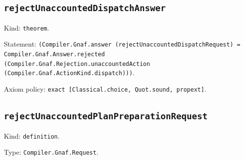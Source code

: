 \documentclass[11pt]{article}
\begin{document}
\subsection*{\texttt{rejectUnaccountedDispatchAnswer}}
\noindent Kind: \texttt{theorem}.\par
\noindent Statement: \texttt{(Compiler.Gnaf.answer (rejectUnaccountedDispatchRequest) = Compiler.Gnaf.Answer.rejected (Compiler.Gnaf.Rejection.unaccountedAction (Compiler.Gnaf.ActionKind.dispatch)))}.\par
\noindent Axiom policy: \texttt{exact [Classical.choice, Quot.sound, propext]}.\par
\subsection*{\texttt{rejectUnaccountedPlanPreparationRequest}}
\noindent Kind: \texttt{definition}.\par
\noindent Type: \texttt{Compiler.Gnaf.Request}.\par
\end{document}
